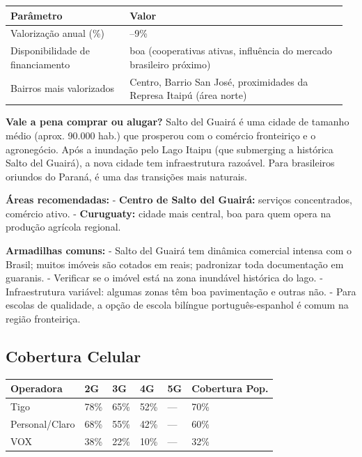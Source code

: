 {\small
\setlength{\tabcolsep}{3pt}
\renewcommand{\arraystretch}{1.12}
\begin{tabularx}{\linewidth}{>{\raggedright\arraybackslash}p{0.34\linewidth} >{\raggedright\arraybackslash}p{0.62\linewidth}}
\toprule
Parâmetro & Valor \\
\midrule
Valorização anual (\%) & 6--9\% \\
Disponibilidade de financiamento & boa (cooperativas ativas, influência do mercado brasileiro próximo) \\
Bairros mais valorizados & Centro, Barrio San José, proximidades da Represa Itaipú (área norte) \\
\bottomrule
\end{tabularx}
}


\textbf{Vale a pena comprar ou alugar?}
Salto del Guairá é uma cidade de tamanho médio (aprox. 90.000 hab.) que prosperou com o comércio fronteiriço e o agronegócio. Após a inundação pelo Lago Itaipu (que submerging a histórica Salto del Guairá), a nova cidade tem infraestrutura razoável. Para brasileiros oriundos do Paraná, é uma das transições mais naturais.

\textbf{Áreas recomendadas:}
- \textbf{Centro de Salto del Guairá:} serviços concentrados, comércio ativo.
- \textbf{Curuguaty:} cidade mais central, boa para quem opera na produção agrícola regional.

\textbf{Armadilhas comuns:}
- Salto del Guairá tem dinâmica comercial intensa com o Brasil; muitos imóveis são cotados em reais; padronizar toda documentação em guaranis.
- Verificar se o imóvel está na zona inundável histórica do lago.
- Infraestrutura variável: algumas zonas têm boa pavimentação e outras não.
- Para escolas de qualidade, a opção de escola bilíngue português-espanhol é comum na região fronteiriça.




\subsection{Cobertura Celular}



{\small
\setlength{\tabcolsep}{3pt}
\renewcommand{\arraystretch}{1.12}
{\small
\begin{tabularx}{\linewidth}{lXXXXX}
\toprule
Operadora & 2G & 3G & 4G & 5G & Cobertura Pop. \\
\midrule
Tigo & 78\% & 65\% & 52\% & --- & 70\% \\
Personal/Claro & 68\% & 55\% & 42\% & --- & 60\% \\
VOX & 38\% & 22\% & 10\% & --- & 32\% \\
\bottomrule
\end{tabularx}
}
}

